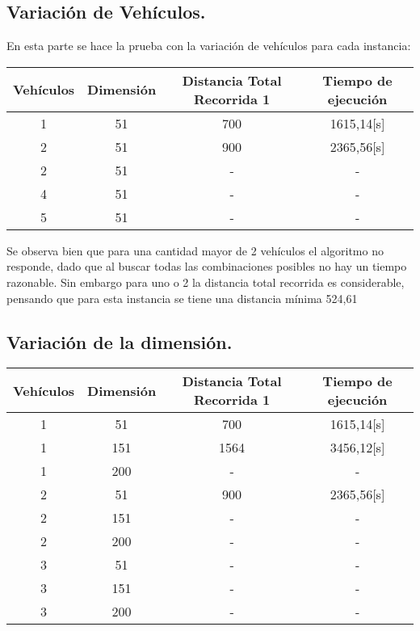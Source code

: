 \documentclass[letter, 10pt]{article}
\begin{document}
\subsection{Variaci\'on de Veh\'iculos.}
En esta parte se hace la prueba con la variaci\'on de veh\'iculos para cada instancia:
\begin{center}
 \begin{tabular}[t]{|c|c|c|c|}
\hline
Veh\'iculos & Dimensi\'on & Distancia Total Recorrida 1 & Tiempo de ejecuci\'on \\
\hline
1   		& 51         & 700     &  1615,14[s] \\
\hline
2           & 51        & 900     &   2365,56[s]\\
\hline
2           & 51        & -     &   -\\
\hline
4           & 51        & -     &  - \\
\hline
5           & 51       & -     &  - \\
\hline
\end{tabular}
\end{center}
Se observa bien que para una cantidad mayor de 2 veh\'iculos el algoritmo no responde, dado que al buscar todas las combinaciones posibles no hay un tiempo razonable. Sin embargo para uno o 2 la distancia total recorrida es considerable, pensando que para esta instancia se tiene una distancia m\'inima 524,61


\subsection{Variaci\'on de la dimensi\'on.}
\begin{center}
 \begin{tabular}[t]{|c|c|c|c|}
\hline
Veh\'iculos & Dimensi\'on & Distancia Total Recorrida 1 & Tiempo de ejecuci\'on \\
\hline
1   		& 51         & 700     &  1615,14[s] \\
\hline
1           & 151        & 1564     &   3456,12[s]\\
\hline
1           & 200        & -     &   -\\
\hline
2           & 51        & 900     &  2365,56[s] \\
\hline
2           & 151       & -     &  - \\
\hline
2           & 200       & -     &  - \\
\hline
3           & 51       & -     &  - \\
\hline
3           & 151       & -     &  - \\
\hline
3           & 200       & -     &  - \\
\hline
\end{tabular}
\end{center}
\end{document}
